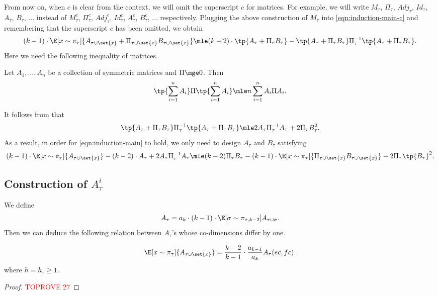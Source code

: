 \documentclass[a4paper,11pt]{article}
\begin{document}
From now on, when $c$ is clear from the context, we will omit the superscript $c$ for matrices.
For example, we will write $M_\tau$, $\Pi_\tau$, $\!{Adj}_\tau$, $\!{Id}_\tau$, $A_\tau$, $B_\tau$, $\dots$ instead of
                           $M^c_\tau$, $\Pi^c_\tau$, $\!{Adj}_\tau^{c}$, $\!{Id}_\tau^{c}$, $A_\tau^c$, $B_\tau^c$, $\dots$ respectively.
Plugging the above construction of $M_\tau$ into \eqref{eqn:induction-main-c} and remembering that the superscript $c$ has been omitted, we obtain
 \[
 (k-1)\cdot\E[x\sim\pi_\tau]{A_{\tau\cup\set{x}}+\Pi_{\tau\cup\set{x}}B_{\tau\cup\set{x}}} \mle (k-2)\cdot\tp{A_\tau+\Pi_\tau B_\tau} -\tp{A_\tau+\Pi_\tau B_\tau}\Pi_\tau^{-1}\tp{A_\tau+\Pi_\tau B_\tau}.
 \]
Here we need the following inequality of matrices.
\begin{lemma}
	\label{lem:matrix-squared-sum}
Let $A_1,\dots,A_n$ be a collection of symmetric matrices and $\Pi\mge 0$. Then
\[
	\tp{\sum_{i=1}^n A_i}\Pi \tp{\sum_{i=1}^n A_i} \mle n\sum_{i=1}^n A_i\Pi A_i.
\]	
\end{lemma}
 It follows from  that
 \[
 \tp{A_\tau+\Pi_\tau B_\tau}\Pi_\tau^{-1}\tp{A_\tau+\Pi_\tau B_\tau}\mle 2A_\tau\Pi_\tau^{-1}A_\tau + 2\Pi_\tau B_\tau^2.
 \]
 As a result, in order for \eqref{eqn:induction-main} to hold, we only need to design $A_\tau$ and $B_\tau$  satisfying
\begin{equation}\label{eqn:condition-main}
 	(k-1)\cdot \E[x\sim\pi_\tau]{A_{\tau\cup\set{x}}} - (k-2) \cdot A_\tau+2A_\tau \Pi_\tau^{-1} A_\tau  \mle (k-2)\Pi_\tau B_\tau -(k-1)\cdot \E[x\sim\pi_\tau]{\Pi_{\tau\cup\set{x}} B_{\tau\cup\set{x}}}-2\Pi_\tau\tp{B_\tau}^2.
\end{equation}

\subsection{Construction of $A_\tau^i$}\label{sss:Atau}
We define
\begin{equation}\label{eqn:A-def}
	A_\tau = a_{k}\cdot (k-1)\cdot \E[\sigma\sim \pi_{\tau, k-2}]{A_{\tau\cup\sigma}}.
\end{equation}
Then we can deduce the following relation between $A_\tau$'s whose co-dimensions differ by one.
\begin{lemma}
	\[
		\E[x\sim \pi_\tau]{A_{\tau\cup\set{x}}} = \frac{k-2}{k-1}\cdot \frac{a_{k-1}}{a_{k}} A_\tau(ec, fc).
	\]
	where $h = h_\tau \geq 1$.
\end{lemma}
\begin{proof}\textcolor{red}{TOPROVE 27}\end{proof}
\end{document}
